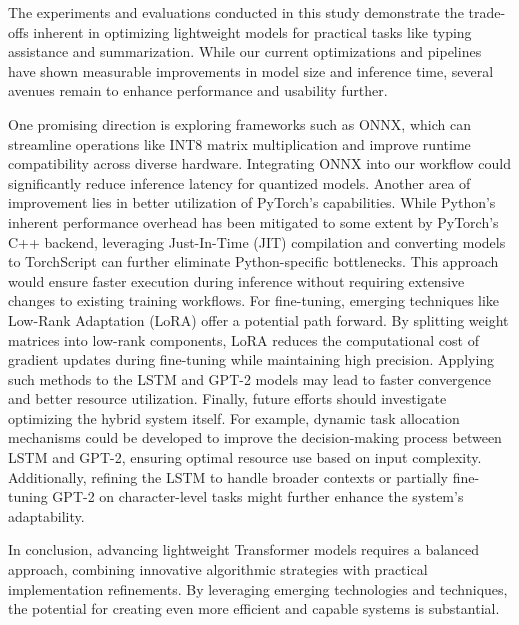 The experiments and evaluations conducted in this study demonstrate the trade-offs inherent in optimizing
lightweight models for practical tasks like typing assistance and summarization.
While our current optimizations and pipelines have shown measurable improvements in model size and inference time,
several avenues remain to enhance performance and usability further.

One promising direction is exploring frameworks such as ONNX, which can streamline operations like INT8 matrix multiplication
and improve runtime compatibility across diverse hardware.
Integrating ONNX into our workflow could significantly reduce inference latency for quantized models.
Another area of improvement lies in better utilization of PyTorch's capabilities.
While Python's inherent performance overhead has been mitigated to some extent by PyTorch's C++ backend,
leveraging Just-In-Time (JIT) compilation and converting models to TorchScript can further eliminate Python-specific bottlenecks.
This approach would ensure faster execution during inference without requiring extensive changes to existing training workflows.
For fine-tuning, emerging techniques like Low-Rank Adaptation (LoRA) offer a potential path forward.
By splitting weight matrices into low-rank components,
LoRA reduces the computational cost of gradient updates during fine-tuning while maintaining high precision.
Applying such methods to the LSTM and GPT-2 models may lead to faster convergence and better resource utilization.
Finally, future efforts should investigate optimizing the hybrid system itself.
For example, dynamic task allocation mechanisms could be developed to improve the decision-making process between LSTM and GPT-2,
ensuring optimal resource use based on input complexity.
Additionally, refining the LSTM to handle broader contexts or partially fine-tuning GPT-2 on character-level tasks
might further enhance the system's adaptability.

In conclusion, advancing lightweight Transformer models requires a balanced approach,
combining innovative algorithmic strategies with practical implementation refinements.
By leveraging emerging technologies and techniques, the potential for creating even more efficient and capable systems is substantial.
